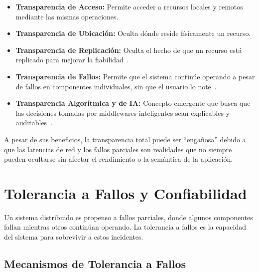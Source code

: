 \documentclass[12pt,a4paper]{article}
\begin{document}
\begin{itemize}
	\item \textbf{Transparencia de Acceso:} Permite acceder a recursos locales y remotos mediante las mismas operaciones.

	\item \textbf{Transparencia de Ubicación:} Oculta dónde reside físicamente un recurso.

	\item \textbf{Transparencia de Replicación:} Oculta el hecho de que un recurso está replicado para mejorar la fiabilidad~\cite{r15}.

	\item \textbf{Transparencia de Fallos:} Permite que el sistema continúe operando a pesar de fallos en componentes individuales, sin que el usuario lo note~\cite{r16}.

	\item \textbf{Transparencia Algorítmica y de IA:} Concepto emergente que busca que las decisiones tomadas por middlewares inteligentes sean explicables y auditables~\cite{r03}.
\end{itemize}

A pesar de sus beneficios, la transparencia total puede ser ``engañosa'' debido a que las latencias de red y los fallos parciales son realidades que no siempre pueden ocultarse sin afectar el rendimiento o la semántica de la aplicación.

\section{Tolerancia a Fallos y Confiabilidad}

Un sistema distribuido es propenso a fallos parciales, donde algunos componentes fallan mientras otros continúan operando. La tolerancia a fallos es la capacidad del sistema para sobrevivir a estos incidentes.

\subsection{Mecanismos de Tolerancia a Fallos}
\end{document}
